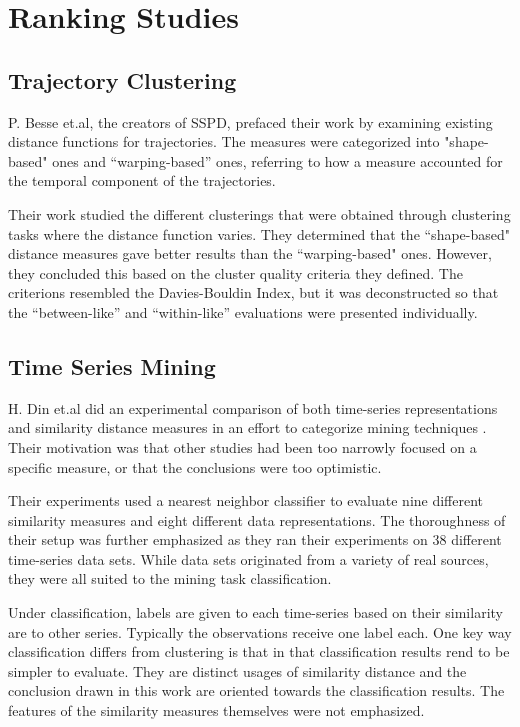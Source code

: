 \section{Ranking Studies }

\subsection{Trajectory Clustering}
P. Besse et.al, the creators of SSPD, prefaced their work by examining existing distance functions for trajectories\cite{50-ReviewPerspective}. 
The measures were categorized into "shape-based" ones and “warping-based” ones, referring to how a measure accounted for the temporal component of the trajectories. 

Their work studied the different clusterings that were obtained through clustering tasks where the distance function varies.
They determined that the “shape-based" distance measures gave better results than the “warping-based" ones. 
However, they concluded this based on the cluster quality criteria they defined.
The criterions resembled the Davies-Bouldin Index, but it was deconstructed so that the “between-like” and “within-like” evaluations were presented individually. 


\subsection{Time Series Mining}
H. Din et.al did an experimental comparison of both time-series representations and similarity distance measures in an effort to categorize mining techniques \cite{26-QueryingMining}. 
Their motivation was that other studies had been too narrowly focused on a specific measure, or that the conclusions were too optimistic. 

Their experiments used a nearest neighbor classifier to evaluate nine different similarity measures and eight different data representations.
The thoroughness of their setup was further emphasized as they ran their experiments on 38 different time-series data sets. 
While data sets originated from a variety of real sources, they were all suited to the mining task classification. 



Under classification, labels are given to each time-series based on their similarity are to other series. Typically the observations receive one label each. 
One key way classification differs from clustering is that in that classification results rend to be simpler to evaluate. 
They are distinct usages of similarity distance and the conclusion drawn in this work are oriented towards the classification results. The features of the similarity measures themselves were not emphasized.  



